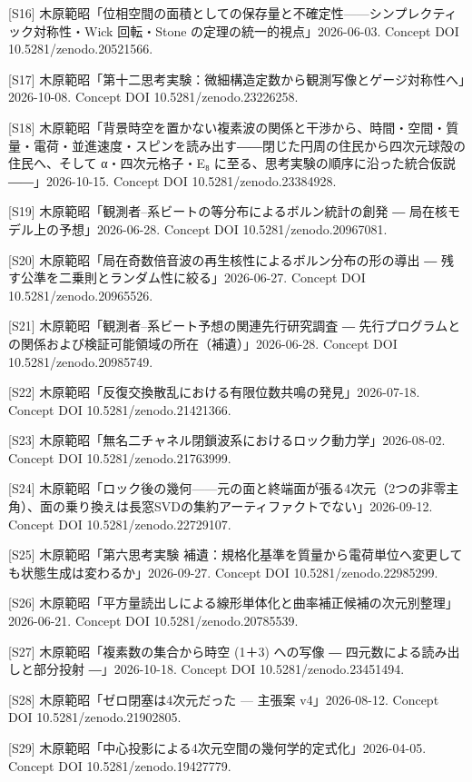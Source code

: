 \documentclass[
  a4paper,
]{ltjsarticle}
\begin{document}
{[}S16{]}
木原範昭「位相空間の面積としての保存量と不確定性------シンプレクティック対称性・Wick
回転・Stone の定理の統一的視点」2026-06-03. Concept DOI
10.5281/zenodo.20521566.

{[}S17{]}
木原範昭「第十二思考実験：微細構造定数から観測写像とゲージ対称性へ」2026-10-08.
Concept DOI 10.5281/zenodo.23226258.

{[}S18{]}
木原範昭「背景時空を置かない複素波の関係と干渉から、時間・空間・質量・電荷・並進速度・スピンを読み出す――閉じた円周の住民から四次元球殻の住民へ、そして
α・四次元格子・E₈ に至る、思考実験の順序に沿った統合仮説――」2026-10-15.
Concept DOI 10.5281/zenodo.23384928.

{[}S19{]} 木原範昭「観測者--系ビートの等分布によるボルン統計の創発 ―
局在核モデル上の予想」2026-06-28. Concept DOI 10.5281/zenodo.20967081.

{[}S20{]} 木原範昭「局在奇数倍音波の再生核性によるボルン分布の形の導出 ―
残す公準を二乗則とランダム性に絞る」2026-06-27. Concept DOI
10.5281/zenodo.20965526.

{[}S21{]} 木原範昭「観測者--系ビート予想の関連先行研究調査 ―
先行プログラムとの関係および検証可能領域の所在（補遺）」2026-06-28.
Concept DOI 10.5281/zenodo.20985749.

{[}S22{]} 木原範昭「反復交換散乱における有限位数共鳴の発見」2026-07-18.
Concept DOI 10.5281/zenodo.21421366.

{[}S23{]}
木原範昭「無名二チャネル閉鎖波系におけるロック動力学」2026-08-02.
Concept DOI 10.5281/zenodo.21763999.

{[}S24{]}
木原範昭「ロック後の幾何------元の面と終端面が張る4次元（2つの非零主角）、面の乗り換えは長窓SVDの集約アーティファクトでない」2026-09-12.
Concept DOI 10.5281/zenodo.22729107.

{[}S25{]} 木原範昭「第六思考実験
補遺：規格化基準を質量から電荷単位へ変更しても状態生成は変わるか」2026-09-27.
Concept DOI 10.5281/zenodo.22985299.

{[}S26{]}
木原範昭「平方量読出しによる線形単体化と曲率補正候補の次元別整理」2026-06-21.
Concept DOI 10.5281/zenodo.20785539.

{[}S27{]} 木原範昭「複素数の集合から時空 (1＋3) への写像 ―
四元数による読み出しと部分投射 ―」2026-10-18. Concept DOI
10.5281/zenodo.23451494.

{[}S28{]} 木原範昭「ゼロ閉塞は4次元だった --- 主張案 v4」2026-08-12.
Concept DOI 10.5281/zenodo.21902805.

{[}S29{]} 木原範昭「中心投影による4次元空間の幾何学的定式化」2026-04-05.
Concept DOI 10.5281/zenodo.19427779.
\end{document}

